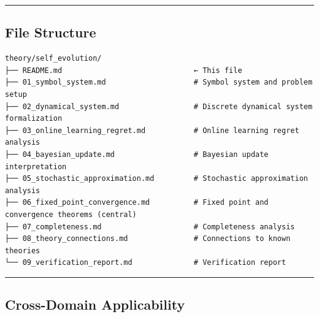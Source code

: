 \documentclass[
  12pt,
]{article}
\begin{document}
\begin{center}\rule{0.5\linewidth}{0.5pt}\end{center}

\subsection{File Structure}\label{file-structure}

\begin{verbatim}
theory/self_evolution/
├── README.md                              ← This file
├── 01_symbol_system.md                    # Symbol system and problem setup
├── 02_dynamical_system.md                 # Discrete dynamical system formalization
├── 03_online_learning_regret.md           # Online learning regret analysis
├── 04_bayesian_update.md                  # Bayesian update interpretation
├── 05_stochastic_approximation.md         # Stochastic approximation analysis
├── 06_fixed_point_convergence.md          # Fixed point and convergence theorems (central)
├── 07_completeness.md                     # Completeness analysis
├── 08_theory_connections.md               # Connections to known theories
└── 09_verification_report.md              # Verification report
\end{verbatim}

\begin{center}\rule{0.5\linewidth}{0.5pt}\end{center}

\subsection{Cross-Domain Applicability}\label{cross-domain-applicability}
\end{document}
